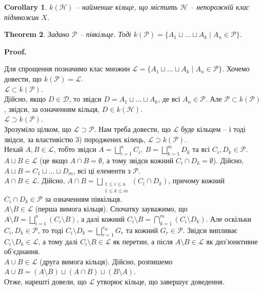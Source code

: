 \documentclass[a4paper, 10pt]{article}
\makeatletter
\theoremstyle{theoremdd}
\newtheorem{theorem}{Theorem}[subsection]
\newtheorem{corollary}[theorem]{Corollary}
\renewenvironment{proof}[1][Proof.\\]{\par
\pushQED{\hfill \qed}%
\normalfont \topsep6\p@\@plus6\p@\relax
\trivlist
\item\relax
{\bfseries
#1\@addpunct{.}}\hspace\labelsep\ignorespaces
}{%
\popQED\endtrivlist\@endpefalse
}
\makeatother
\begin{document}
\begin{corollary}
$k(\mathcal{H})$ -- найменше кільце, що містить $\mathcal{H}$ -- непорожній клас підмножин $X$.
\end{corollary}

\begin{theorem}
\label{ring_generated_by_semiring}
Задано $\mathcal{P}$ -- півкільце. Тоді $k(\mathcal{P}) = \{ A_1 \sqcup \dots \sqcup A_k \mid A_n \in \mathcal{P} \}$.
\end{theorem}

\begin{proof}
Для спрощення позначимо клас множин $\mathcal{L} = \{A_1 \sqcup \dots \sqcup A_k \mid A_n \in \mathcal{P}\}$. Хочемо довести, що $k(\mathcal{P}) = \mathcal{L}$.\\
$\mathcal{L} \subset k(\mathcal{P})$.\\
Дійсно, якщо $D \in \mathcal{D}$, то звідси $D = A_1 \sqcup \dots \sqcup A_k$, де всі $A_n \in \mathcal{P}$. Але $\mathcal{P} \subset k(\mathcal{P})$, звідси, за означенням кільця, $D \in k(\mathcal{H})$.\\
$\mathcal{L} \supset k(\mathcal{P})$.\\
Зрозуміло цілком, що $\mathcal{L} \supset \mathcal{P}$. Нам треба довести, що $\mathcal{L}$ буде кільцем -- і тоді звідси, за властивістю 3) породжених кілець, $\mathcal{L} \supset k(\mathcal{P})$.\\
Нехай $A,B \in \mathcal{L}$, тобто звідси $A = \displaystyle\bigsqcup_{i=1}^n C_i,\ B = \displaystyle\bigsqcup_{k=1}^m D_k$ та всі $C_i, D_k \in \mathcal{P}$.\\
$A \sqcup B \in \mathcal{L}$ (це якщо $A \cap B = \emptyset$, а тому звідси кожний $C_i \cap D_k = \emptyset$). Дійсно, $A \sqcup B = C_1 \sqcup \dots \sqcup D_m$, всі ці елементи з $\mathcal{P}$.\\
$A \cap B \in \mathcal{L}$. Дійсно, $A \cap B = \displaystyle\bigsqcup_{\substack{1 \leq i \leq n \\ 1 \leq k \leq m}} (C_i \cap D_k)$, причому кожний $C_i \cap D_k \in \mathcal{P}$ за означенням півкільця.\\
$A \setminus B \in \mathcal{L}$ (перша вимога кільця). Спочатку зауважимо, що $A \setminus B = \displaystyle\bigsqcup_{i=1}^n (C_i \setminus B)$, а далі кожний $C_i \setminus B = \displaystyle\bigcap_{k=1}^m (C_i \setminus D_k)$. Але оскільки $C_i,D_k \in \mathcal{P}$, то тоді $C_i \setminus D_k = \displaystyle\bigsqcup_{r=1}^{s_{ik}} G_r$ та кожний $G_r \in \mathcal{P}$. Звідси випливає $C_i \setminus D_k \in \mathcal{L}$, а тому далі $C_i \setminus B \in \mathcal{L}$ як перетин, а після $A \setminus B \in \mathcal{L}$ як диз'юнктивне об'єднання.\\
$A \cup B \in \mathcal{L}$ (друга вимога кільця). Дійсно, розпишемо $A \cup B = (A \setminus B) \sqcup (A \cap B) \sqcup (B \setminus A)$.\\
Отже, нарешті довели, що $\mathcal{L}$ утворює кільце, що завершує доведення.
\end{proof}
\end{document}
